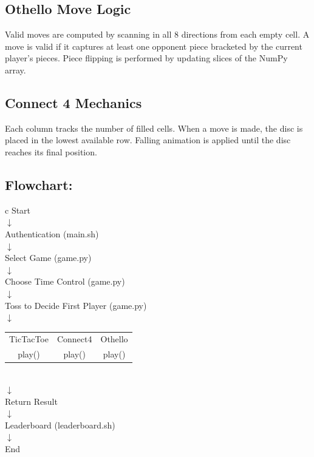 \documentclass[12pt]{article}
\begin{document}
\subsection{Othello Move Logic}
Valid moves are computed by scanning in all 8 directions from each empty cell. A move is valid if it captures at least one opponent piece bracketed by the current player's pieces. Piece flipping is performed by updating slices of the NumPy array.

\subsection{Connect 4 Mechanics}
Each column tracks the number of filled cells. When a move is made, the disc is placed in the lowest available row. Falling animation is applied until the disc reaches its final position.

\subsection{Flowchart:}

\begin{center}
\begin{tabular}{c}
Start \\
$\downarrow$ \\
Authentication (main.sh) \\
$\downarrow$ \\
Select Game (game.py)\\
$\downarrow$ \\
Choose Time Control (game.py)\\
$\downarrow$ \\
Toss to Decide First Player (game.py)\\
$\downarrow$ \\
\begin{tabular}{ccc}
TicTacToe & Connect4 & Othello \\
play() & play() & play()
\end{tabular} \\
$\downarrow$ \\
Return Result \\
$\downarrow$ \\
Leaderboard (leaderboard.sh) \\
$\downarrow$ \\
End
\end{tabular}
\end{center}
\end{document}
